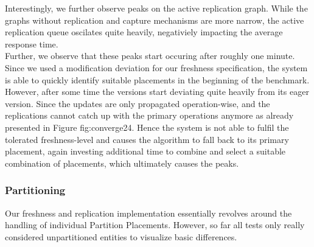 Interestingly, we further observe peaks on the active replication graph. While the graphs without replication and capture mechanisms are more narrow,
the active replication queue oscilates quite heavily, negativiely impacting the average response time.\\
Further, we observe that these peaks start occuring after roughly one minute.
Since we used a modification deviation for our freshness specification, the system is able to quickly identify suitable placements in the beginning of the benchmark.
However, after some time the versions start deviating quite heavily from its eager version.
Since the updates are only propagated operation-wise, and the replications cannot catch up with the primary operations anymore as already presented in Figure \refname{fig:converge24}.
Hence the system is not able to fulfil the tolerated freshness-level and
causes the algorithm to fall back to its primary placement, again investing additional time to combine and select a suitable combination of placements, which ultimately causes the peaks.




\subsubsection{Partitioning} 

Our freshness and replication implementation essentially revolves around the handling of individual Partition Placements.
However, so far all tests only really considered unpartitioned entities to visualize basic differences. 

